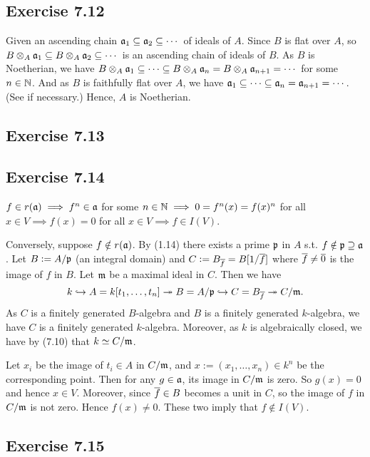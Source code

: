 \documentclass[../A&M.tex]{subfiles}
\begin{document}
\subsection*{Exercise 7.12}

Given an ascending chain $\mathfrak{a}_1 \subseteq \mathfrak{a}_2 \subseteq \cdots$ of ideals of $A$. Since $B$ is flat over $A$, so $B\otimes_A \mathfrak{a}_1 \subseteq B \otimes_A \mathfrak{a}_2 \subseteq \cdots$ is an ascending chain of ideals of $B$. As $B$ is Noetherian, we have $B\otimes_A \mathfrak{a}_1 \subseteq \cdots \subseteq B \otimes_A \mathfrak{a}_n = B \otimes_A \mathfrak{a}_{n+1} = \cdots$ for some $n\in\mathbb{N}$. And as $B$ is faithfully flat over $A$, we have $\mathfrak{a}_1 \subseteq \cdots \subseteq \mathfrak{a}_n = \mathfrak{a}_{n+1} = \cdots$. (See  if necessary.) Hence, $A$ is Noetherian.

\subsection*{Exercise 7.13}

\subsection*{Exercise 7.14}

$f \in r(\mathfrak{a}) \implies f^n \in\mathfrak{a}$ for some $n\in\mathbb{N} \implies 0 = f^n(x) = f(x)^n$ for all $x \in V \implies f(x)=0$ for all $x \in V \implies f \in I(V)$.

Conversely, suppose $f \notin r(\mathfrak{a})$. By (1.14) there exists a prime $\mathfrak{p}$ in $A$ s.t. $f\notin \mathfrak{p} \supseteq \mathfrak{a}$. Let $B:= A/\mathfrak{p}$ (an integral domain) and $C:= B_{\overline{f}} = B[1/\overline{f}]$ where $\overline{f} \neq \overline{0}$ is the image of $f$ in $B$. Let $\mathfrak{m}$ be a maximal ideal in $C$. Then we have
$$
k \hookrightarrow A = k[t_1,\ldots,t_n] \twoheadrightarrow B = A/\mathfrak{p} \hookrightarrow C = B_{\overline{f}} \twoheadrightarrow C/\mathfrak{m}.
$$
As $C$ is a finitely generated $B$-algebra and $B$ is a finitely generated $k$-algebra, we have $C$ is a finitely generated $k$-algebra. Moreover, as $k$ is algebraically closed, we have by (7.10) that $k \simeq C/\mathfrak{m}$.

Let $x_i$ be the image of $t_i \in A$ in $C/\mathfrak{m}$, and $x:=(x_1,\ldots,x_n) \in k^n$ be the corresponding point. Then for any $g\in\mathfrak{a}$, its image in $C/\mathfrak{m}$ is zero. So $g(x) = 0$ and hence $x\in V$. Moreover, since $\overline{f} \in B$ becomes a unit in $C$, so the image of $f$ in $C/\mathfrak{m}$ is not zero. Hence $f(x)\neq0$. These two imply that $f \notin I(V)$.

\subsection*{Exercise 7.15}
\end{document}
